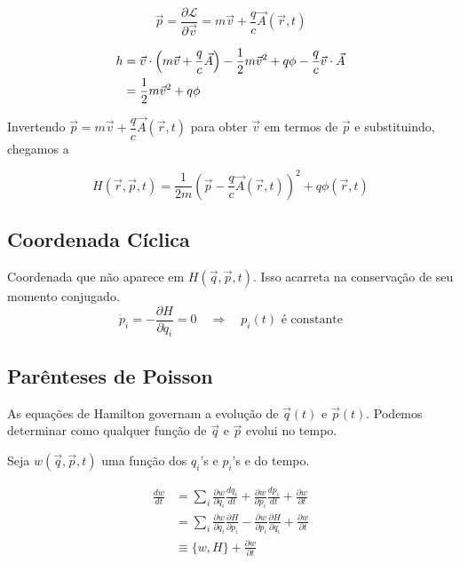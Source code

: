 \begin{equation}
    \vec{p} = \frac{\partial \mathcal{L}}{\partial \vec{v}} = m\vec{v} + \frac{q}{c}\vec{A}(\vec{r}, t)
\label{eq:aula9_p_em}
\end{equation}

\begin{align}
    h &= \vec{v} \cdot \left( m\vec{v} + \frac{q}{c}\vec{A} \right) - \frac{1}{2}m\vec{v}^2 + q\phi - \frac{q}{c}\vec{v}\cdot\vec{A} \notag \\
    &= \frac{1}{2}m\vec{v}^2 + q\phi
\label{eq:aula9_h_em}
\end{align}

Invertendo $\vec{p} = m\vec{v} + \dfrac{q}{c}\vec{A}(\vec{r},t)$ para obter $\vec{v}$ em termos de $\vec{p}$ e substituindo, chegamos a

\begin{equation}
    \boxed{H(\vec{r}, \vec{p}, t) = \frac{1}{2m}\left( \vec{p} - \frac{q}{c}\vec{A}(\vec{r}, t) \right)^2 + q\phi(\vec{r}, t)}
\label{eq:aula9_H_em_final}
\end{equation}

\subsection*{Coordenada Cíclica}

Coordenada que não aparece em $H(\vec{q}, \vec{p}, t)$. Isso acarreta na conservação de seu momento conjugado.
\begin{equation}
    \dot{p}_i = -\frac{\partial H}{\partial q_i} = 0 \quad \Longrightarrow \quad \boxed{p_i(t) \text{ é constante}}
\label{eq:aula9_coord_ciclica}
\end{equation}

\subsection*{Parênteses de Poisson}

As equações de Hamilton governam a evolução de $\vec{q}(t)$ e $\vec{p}(t)$. Podemos determinar como qualquer função de $\vec{q}$ e $\vec{p}$ evolui no tempo.

Seja $w(\vec{q}, \vec{p}, t)$ uma função dos $q_i$'s e $p_i$'s e do tempo.

\begin{align}
    \frac{dw}{dt} &= \sum_i \frac{\partial w}{\partial q_i}\frac{dq_i}{dt} + \frac{\partial w}{\partial p_i}\frac{dp_i}{dt} + \frac{\partial w}{\partial t} \label{eq:aula9_dwdt_1} \\
    &= \sum_i \frac{\partial w}{\partial q_i}\frac{\partial H}{\partial p_i} - \frac{\partial w}{\partial p_i}\frac{\partial H}{\partial q_i} + \frac{\partial w}{\partial t} \label{eq:aula9_dwdt_2} \\
    &\equiv \{w, H\} + \frac{\partial w}{\partial t} \label{eq:aula9_dwdt_3}
\end{align}

